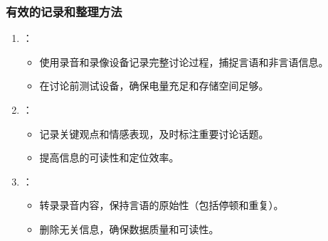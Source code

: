\documentclass[letterpaper,10pt,english]{sphinxmanual}
\begin{document}
\subsubsection{有效的记录和整理方法}
\label{\detokenize{user-research/focus-group:id22}}\begin{enumerate}
%
\item {} 
\sphinxAtStartPar
{}：
\begin{itemize}
\item {} 
\sphinxAtStartPar
使用录音和录像设备记录完整讨论过程，捕捉言语和非言语信息。

\item {} 
\sphinxAtStartPar
在讨论前测试设备，确保电量充足和存储空间足够。

\end{itemize}

\item {} 
\sphinxAtStartPar
{}：
\begin{itemize}
\item {} 
\sphinxAtStartPar
记录关键观点和情感表现，及时标注重要讨论话题。

\item {} 
\sphinxAtStartPar
提高信息的可读性和定位效率。

\end{itemize}

\item {} 
\sphinxAtStartPar
{}：
\begin{itemize}
\item {} 
\sphinxAtStartPar
转录录音内容，保持言语的原始性（包括停顿和重复）。

\item {} 
\sphinxAtStartPar
删除无关信息，确保数据质量和可读性。

\end{itemize}

\end{enumerate}
\end{document}
